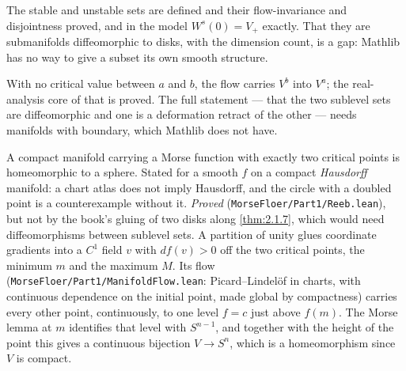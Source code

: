 \begin{proposition}
  \label{prop:2.1.5}
  \notready
  The stable and unstable sets are defined and their flow-invariance and
  disjointness proved, and in the model $W^s(0) = V_+$ exactly.  That they are
  submanifolds diffeomorphic to disks, with the dimension count, is a gap:
  Mathlib has no way to give a subset its own smooth structure.
\end{proposition}

\begin{theorem}
  \label{thm:2.1.7}
  \notready
  With no critical value between $a$ and $b$, the flow carries $V^b$ into $V^a$;
  the real-analysis core of that is proved.  The full statement --- that the two
  sublevel sets are diffeomorphic and one is a deformation retract of the other
  --- needs manifolds with boundary, which Mathlib does not have.
\end{theorem}

\begin{corollary}
  \label{cor:2.1.9}
  \leanok
  A compact manifold carrying a Morse function with exactly two critical points
  is homeomorphic to a sphere.  Stated for a smooth $f$ on a compact
  \emph{Hausdorff} manifold: a chart atlas does not imply Hausdorff, and the
  circle with a doubled point is a counterexample without it.
  \emph{Proved} (\texttt{MorseFloer/Part1/Reeb.lean}), but not by the book's
  gluing of two disks along \ref{thm:2.1.7}, which would need diffeomorphisms
  between sublevel sets.  A partition of unity glues coordinate gradients into a
  $C^1$ field $v$ with $df(v) > 0$ off the two critical points, the minimum $m$
  and the maximum $M$.  Its flow (\texttt{MorseFloer/Part1/ManifoldFlow.lean}:
  Picard--Lindel\"of in charts, with continuous dependence on the initial point,
  made global by compactness) carries every other point, continuously, to one
  level $f = c$ just above $f(m)$.  The Morse lemma at $m$ identifies that level
  with $S^{n-1}$, and together with the height of the point this gives a
  continuous bijection $V \to S^n$, which is a homeomorphism since $V$ is
  compact.
\end{corollary}

